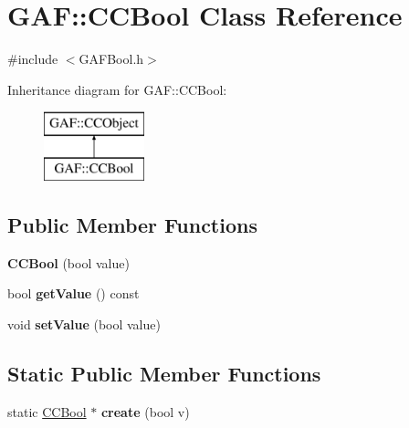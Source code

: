 \hypertarget{class_g_a_f_1_1_c_c_bool}{\section{G\-A\-F\-:\-:C\-C\-Bool Class Reference}
\label{class_g_a_f_1_1_c_c_bool}
}


{\ttfamily \#include $<$G\-A\-F\-Bool.\-h$>$}

Inheritance diagram for G\-A\-F\-:\-:C\-C\-Bool\-:\begin{figure}[H]
\begin{center}
\leavevmode
\includegraphics[height=2.000000cm]{class_g_a_f_1_1_c_c_bool}
\end{center}
\end{figure}
\subsection*{Public Member Functions}
\begin{DoxyCompactItemize}
\item 
\hypertarget{class_g_a_f_1_1_c_c_bool_aac86a418ff39a1e7b3df958bd3290449}{{\bfseries C\-C\-Bool} (bool value)}\label{class_g_a_f_1_1_c_c_bool_aac86a418ff39a1e7b3df958bd3290449}

\item 
\hypertarget{class_g_a_f_1_1_c_c_bool_a5a7a3cd1a9a5a67c25d76a7c4708e3b9}{bool {\bfseries get\-Value} () const }\label{class_g_a_f_1_1_c_c_bool_a5a7a3cd1a9a5a67c25d76a7c4708e3b9}

\item 
\hypertarget{class_g_a_f_1_1_c_c_bool_a3a5700928870a0f90097295836fd9542}{void {\bfseries set\-Value} (bool value)}\label{class_g_a_f_1_1_c_c_bool_a3a5700928870a0f90097295836fd9542}

\end{DoxyCompactItemize}
\subsection*{Static Public Member Functions}
\begin{DoxyCompactItemize}
\item 
\hypertarget{class_g_a_f_1_1_c_c_bool_ae52ca9fbf79812400ce0bc8aa8bb4984}{static \hyperlink{class_g_a_f_1_1_c_c_bool}{C\-C\-Bool} $\ast$ {\bfseries create} (bool v)}\label{class_g_a_f_1_1_c_c_bool_ae52ca9fbf79812400ce0bc8aa8bb4984}

\end{DoxyCompactItemize}


